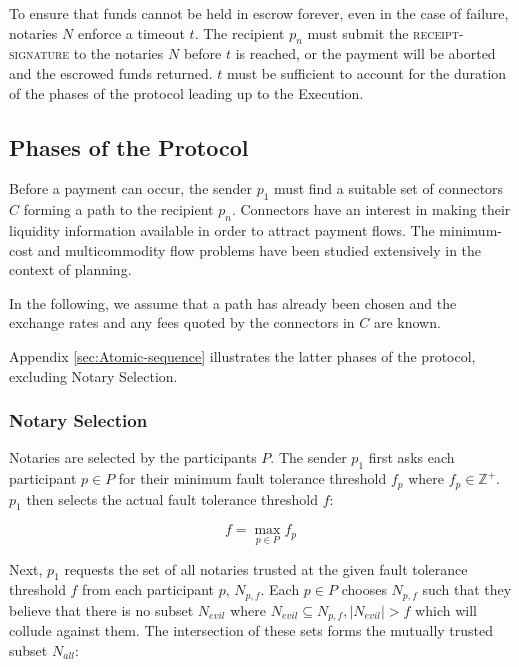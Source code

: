 \documentclass[letterpaper,twocolumn,10pt]{article}
\begin{document}

To ensure that funds cannot be held in escrow forever, even in the case of failure, notaries $N$ enforce a timeout $t$. The recipient $p_n$ must submit the \textsc{receipt-signature} to the notaries $N$ before $t$ is reached, or the payment will be aborted and the escrowed funds returned. $t$ must be sufficient to account for the duration of the phases of the protocol leading up to the Execution.

\subsection{Phases of the Protocol}

Before a payment can occur, the sender $p_1$ must find a suitable set of connectors $C$ forming a path to the recipient $p_n$. Connectors have an interest in making their liquidity information available in order to attract payment flows. The minimum-cost and multicommodity flow problems have been studied extensively in the context of planning. \cite{ahuja1988network} \cite{cai2001time} \cite{wagner1959class}

In the following, we assume that a path has already been chosen and the exchange rates and any fees quoted by the connectors in $C$ are known.

Appendix \ref{sec:Atomic-sequence} illustrates the latter phases of the protocol, excluding Notary Selection.

\subsubsection{Notary Selection}
\label{subsec:notary-selection}


Notaries are selected by the participants $P$. The sender $p_1$ first asks each participant $p \in P$  for their minimum fault tolerance threshold $f_p$ where $f_p \in \mathbb{Z}^+$. $p_1$ then selects the actual fault tolerance threshold $f$:

\begin{equation}
f = \max_{p \in P} f_p
\end{equation}

Next, $p_1$ requests the set of all notaries trusted at the given fault tolerance threshold $f$ from each participant $p$, $N_{p,f}$. Each $p \in P$ chooses $N_{p,f}$ such that they believe that there is no subset $N_{evil}$ where $N_{evil} \subseteq N_{p,f}, |N_{evil}| > f$ which will collude against them. The intersection of these sets forms the mutually trusted subset $N_{all}$:
\end{document}
